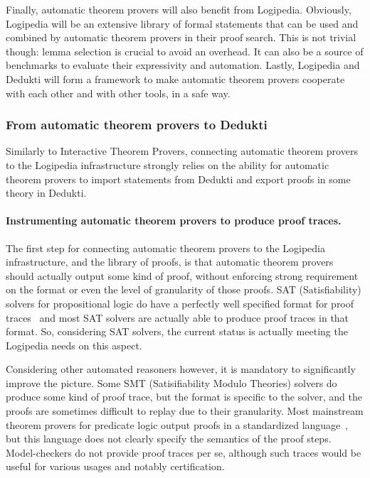 Finally, automatic theorem provers will also benefit from
Logipedia. Obviously, Logipedia will be an extensive library of formal
statements that can be used and combined by automatic theorem provers
in their proof search. This is not trivial though: lemma selection is
crucial to avoid an overhead. It can also be a source of benchmarks to
evaluate their expressivity and automation.  Lastly, Logipedia and
Dedukti will form a framework to make automatic theorem provers
cooperate with each other and with other tools, in a safe way.


\subsubsection*{From automatic theorem provers to Dedukti}

Similarly to Interactive Theorem Provers, connecting automatic theorem
provers to the Logipedia infrastructure strongly relies on the ability
for automatic theorem provers to import statements from Dedukti and
export proofs in some theory in Dedukti.


\paragraph*{Instrumenting automatic theorem provers to produce proof traces.}
The first step for connecting automatic theorem provers to the
Logipedia infrastructure, and the library of proofs, is that automatic
theorem provers should actually output some kind of proof, without
enforcing strong requirement on the format or even the level of
granularity of those proofs.  SAT (Satisfiability) solvers for
propositional logic do have a perfectly well specified format for
proof traces~\cite{TODO} and most SAT solvers are actually able to
produce proof traces in that format.  So, considering SAT solvers, the
current status is actually meeting the Logipedia needs on this aspect.

Considering other automated reasoners however, it is mandatory to
significantly improve the picture.  Some SMT (Satisifiability Modulo
Theories) solvers do produce some kind of proof trace, but the format
is specific to the solver, and the proofs are sometimes difficult to
replay due to their granularity.  Most mainstream theorem provers for
predicate logic output proofs in a standardized language~\cite{TODO},
but this language does not clearly specify the semantics of the proof
steps.  Model-checkers do not provide proof traces per se, although
such traces would be useful for various usages and notably
certification.


